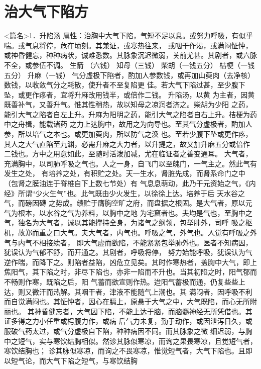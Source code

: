 \documentclass[a4paper,12pt,UTF8,twoside]{ctexbook}
\begin{document}
\chapter{治大气下陷方}
<篇名>1．升陷汤
属性：治胸中大气下陷，气短不足以息。或努力呼吸，有似乎喘。或气息将停，危在顷刻。其兼证，或寒热往来， 
或咽干作渴，或满闷怔忡，或神昏健忘，种种病状，诚难悉数。其脉象沉迟微弱，关前尤甚。其剧者，或六脉 
不全，或参伍不调。 
生箭 （六钱） 知母（三钱） 柴胡（一钱五分） 桔梗（一钱五分） 升麻（一钱） 
气分虚极下陷者，酌加人参数钱，或再加山萸肉（去净核）数钱，以收敛气分之耗散，使升者不至复陷更 
佳。若大气下陷过甚，至少腹下坠，或更作疼者，宜将升麻改用钱半，或倍作二钱。 
升陷汤，以黄 为主者，因黄 既善补气，又善升气。惟其性稍热，故以知母之凉润者济之。柴胡为少阳 
之药，能引大气之陷者自左上升。升麻为阳明之药，能引大气之陷者自右上升。桔梗为药中之舟楫，能载诸药 
之力上达胸中，故用之为向导也。至其气分虚极者，酌加人参，所以培气之本也。或更加萸肉，所以防气之涣 
也。至若少腹下坠或更作疼，其人之大气直陷至九渊，必需升麻之大力者，以升提之，故又加升麻五分或倍作 
二钱也。方中之用意如此，至随时活泼加减，尤在临证者之善变通耳。 
大气者，充满胸中，以司肺呼吸之气也。人之一身，自飞门以至魄门，一气主之。然此气有发生之处， 
有培养之处，有积贮之处。天一生水，肾脏先成，而肾系命门之中（包肾之膜油连于脊椎自下上数七节处）有 
气息息萌动，此乃干元资始之气，《内经》所谓“少火生气”也。此气既由少火发生，以徐徐上达。培养于后 
天水谷之气，而磅因礴 
之势成。绩贮于膺胸空旷之府，而盘据之根固。是大气者，原以元气为根本，以水谷之气为养料，以胸中之地 
为宅窟者也。夫均是气也，至胸中之气，独名为大气者，诚以其能撑持全身，为诸气之纲领，包举肺外，司呼 
吸之枢机，故郑而重之曰大气。夫大气者，内气也。呼吸之气，外气也。人觉有呼吸之外气与内气不相接续者， 
即大气虚而欲陷，不能紧紧包举肺外也。医者不知病因，犹误认为气郁不舒，而开通之。其剧者，呼吸将停， 
努力始能呼吸，犹误认为气逆作喘，而降下之。则陷者益陷，凶危立见矣。其时作寒热者，盖胸中大气，即上 
焦阳气，其下陷之时，非尽下陷也，亦非一陷而不升也。当其初陷之时，阳气郁而不畅则作寒，既陷之后，阳 
气蓄而欲宣则作热。迨阳气蓄极而通，仍复些些上达，则又微汗而热解。其咽干者，津液不能随气上潮也。其 
满闷者，因呼吸不利而自觉满闷也。其怔忡者，因心在膈上，原悬于大气之中，大气既陷，而心无所附丽也。 
其神昏健忘者，大气因下陷，不能上达于脑，而脑髓神经无所凭借也。其证多得之力小任重或枵腹力作，或病 
后气力未复，勤于动作，或因泄泻日久，或服破气药太过，或气分虚极自下陷，种种病因不同。而其脉象之微 
细迟弱，与胸中之短气，实与寒饮结胸相似。然诊其脉似寒凉，而询之果畏寒凉，且觉短气者，寒饮结胸也； 
诊其脉似寒凉，而询之不畏寒凉，惟觉短气者，大气下陷也。且即以短气论，而大气下陷之短气，与寒饮结胸 
\end{document}

